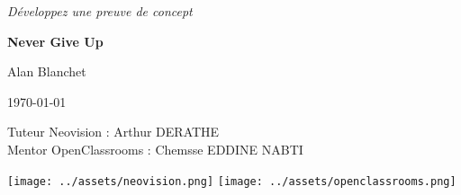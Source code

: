 \begin{titlepage}
    

    \begin{center}
        \vspace*{5cm}

        \Huge
        {\it Développez une preuve de concept}

        \LARGE
        \textbf{Never Give Up}

        \vspace{1cm}

        \Large
        Alan Blanchet

        \small
        \today

        \vspace{5cm}

        \large
        \begin{center}
            Tuteur Neovision : Arthur DERATHE\\
            Mentor OpenClassrooms : Chemsse EDDINE NABTI
        \end{center}

        \vfill

        \texttt{[image: ../assets/neovision.png]}
        \hspace{1cm}
        \texttt{[image: ../assets/openclassrooms.png]}
    \end{center}

    \newpage
\end{titlepage}